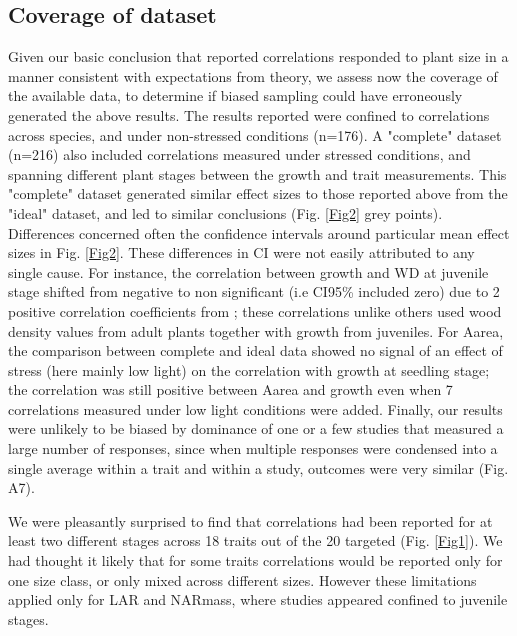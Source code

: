 \documentclass[a4paper]{article}\usepackage[]{graphicx}\usepackage[]{color}
\begin{document}
\subsection*{Coverage of dataset}

Given our basic conclusion that reported correlations responded to plant size in a manner consistent with expectations from theory, we assess now the coverage of the available data, to determine if biased sampling could have erroneously generated the above results. The results reported were confined to correlations across species, and under non-stressed conditions (n=176). A "complete" dataset (n=216) also included correlations measured under stressed conditions, and spanning different plant stages between the growth and trait measurements. This "complete" dataset generated similar effect sizes to those reported above from the "ideal" dataset, and led to similar conclusions (Fig. \ref{Fig2} grey points). Differences concerned often the confidence intervals around particular mean effect sizes in Fig. \ref{Fig2}. These differences in CI were not easily attributed to any single cause. For instance, the correlation between growth and WD at juvenile stage shifted from negative to non significant (i.e CI95\% included zero) due to 2 positive correlation coefficients from \citet{Augspurger:1984ct};  these correlations unlike others used wood density values from adult plants together with growth from juveniles. For Aarea, the comparison between complete and ideal data showed no signal of an effect of stress (here mainly low light) on the correlation with growth at seedling stage; the correlation was still positive between Aarea and growth even when 7 correlations measured under low light conditions were added. Finally, our results were unlikely to be biased by dominance of one or a few studies that measured a large number of responses, since when multiple responses were condensed into a single average within a trait and within a study, outcomes were very similar (Fig. A7).

We were pleasantly surprised to find that correlations had been reported for at least two different stages across 18 traits out of the 20 targeted (Fig. \ref{Fig1}). We had thought it likely that for some traits correlations would be reported only for one size class, or only mixed across different sizes. However these limitations applied only for LAR and NARmass, where studies appeared confined to juvenile stages.  
\end{document}
